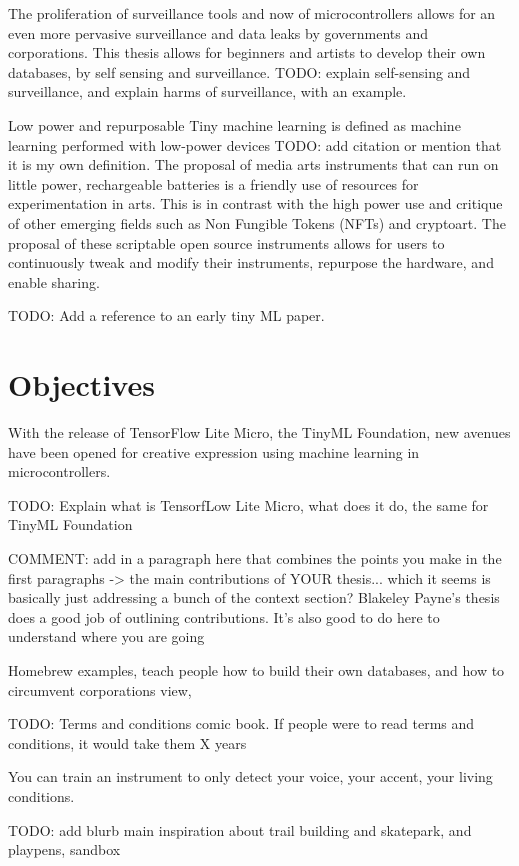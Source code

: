 The proliferation of surveillance tools and now of microcontrollers allows for an even more pervasive surveillance and data leaks by governments and corporations. This thesis allows for beginners and artists to develop their own databases, by self sensing and surveillance. TODO: explain self-sensing and surveillance, and explain harms of surveillance, with an example.

Low power and repurposable
Tiny machine learning is defined as machine learning performed with low-power devices TODO: add citation or mention that it is my own definition. The proposal of media arts instruments that can run on little power, rechargeable batteries is a friendly use of resources for experimentation in arts. This is in contrast with the high power use and critique of other emerging fields such as Non Fungible Tokens (NFTs) and cryptoart. The proposal of these scriptable open source instruments allows for users to continuously tweak and modify their instruments, repurpose the hardware, and enable sharing.

TODO: Add a reference to an early tiny ML paper.

\section{Objectives}

With the release of TensorFlow Lite Micro, the TinyML Foundation, new avenues have been opened for creative expression using machine learning in microcontrollers.

TODO: Explain what is TensorfLow Lite Micro, what does it do, the same for TinyML Foundation

COMMENT: add in a paragraph here that combines the points you make in the first paragraphs -> the main contributions of YOUR thesis... which it seems is basically just addressing a bunch of the context section? Blakeley Payne's thesis does a good job of outlining contributions. It's also good to do here to understand where you are going

Homebrew examples, teach people how to build their own databases, and how to circumvent corporations view,

TODO: Terms and conditions comic book. If people were to read terms and conditions, it would take them X years

You can train an instrument to only detect your voice, your accent, your living conditions.

TODO: add blurb main inspiration about trail building and skatepark, and playpens, sandbox


